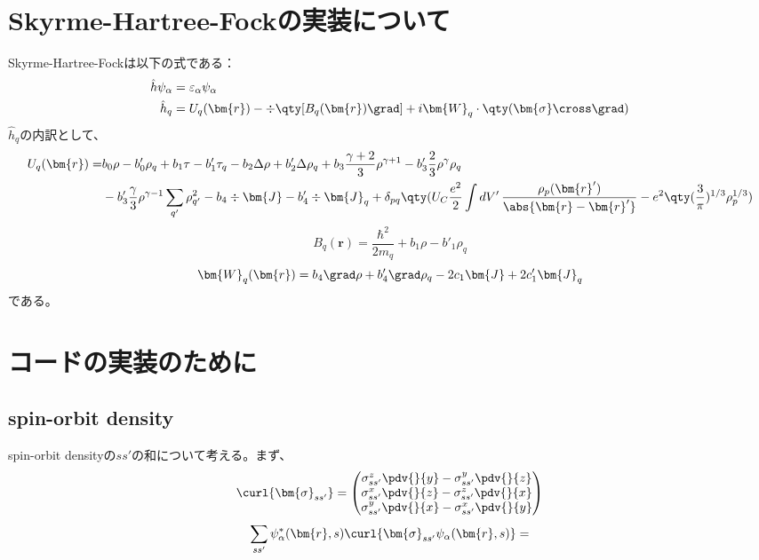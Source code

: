 \documentclass[a4paper,11pt,uplatex]{jsarticle}%
\begin{document}
\section*{Skyrme-Hartree-Fockの実装について}
Skyrme-Hartree-Fockは以下の式である：
\begin{align}
  \hat{h}\psi_\alpha & = \varepsilon_\alpha\psi_\alpha                                                      \\
  \hat{h}_q          & = U_q(\bm{r})-\div\qty[B_q(\bm{r})\grad]+i\bm{W}_q\cdot\qty(\bm{\sigma}\cross \grad)
\end{align}
$\hat{h}_q$の内訳として、
\begin{align}
  U_q(\bm{r}) = & b_0\rho - b'_0\rho_q + b_1\tau - b'_1\tau_q - b_2\Delta\rho + b'_2\Delta\rho_q + b_3\frac{\gamma+2}{3}\rho^{\gamma+1}-b'_3\frac{2}{3}\rho^{\gamma}\rho_q \notag                                                                   \\
                & - b'_3\frac{\gamma}{3}\rho^{\gamma-1}\sum_{q'}\rho_{q'}^2 - b_4\div{\bm{J}}-b'_4\div{\bm{J}_q} + \delta_{pq}\qty(U_C\frac{e^2}{2}\int dV'\,\frac{\rho_p(\bm{r}')}{\abs{\bm{r}-\bm{r}'}}-e^2\qty(\frac{3}{\pi})^{1/3}\rho_p^{1/3})
\end{align}
\begin{equation}
  B_q(\bm{r}) = \frac{\hbar^2}{2m_q}+b_1\rho -b'_1\rho_q
\end{equation}
\begin{equation}
  \bm{W}_q(\bm{r}) = b_4\grad\rho + b'_4\grad\rho_q - 2c_1\bm{J} + 2c'_1\bm{J}_q
\end{equation}
である。

\section{コードの実装のために}
\subsection{spin-orbit density}
spin-orbit densityの$ss'$の和について考える。まず、
\begin{equation}
  \curl{\bm{\sigma}_{ss'}} =
  \begin{pmatrix}
    \sigma_{ss'}^z\pdv{}{y} - \sigma_{ss'}^y\pdv{}{z} \\
    \sigma_{ss'}^x\pdv{}{z} - \sigma_{ss'}^z\pdv{}{x} \\
    \sigma_{ss'}^y\pdv{}{x} - \sigma_{ss'}^x\pdv{}{y}
  \end{pmatrix}
\end{equation}
\begin{equation}
  \sum_{ss'}\psi^*_{\alpha}(\bm{r},s)\curl{\bm{\sigma}_{ss'}\psi_\alpha(\bm{r},s)} =
\end{equation}
\end{document}
